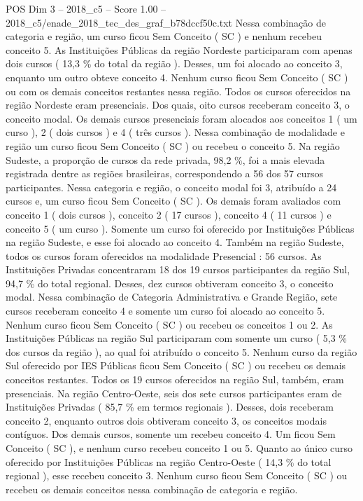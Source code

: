 \begin{textsample}{POS Dim 3 – 2018\_c5 – Score 1.00 – 2018\_c5/enade\_2018\_tec\_des\_graf\_b78dccf50c.txt}
Nessa combinação de categoria e região, um curso ficou Sem Conceito ( SC ) e nenhum recebeu conceito 5.
As Instituições Públicas da região Nordeste participaram com apenas dois cursos ( 13,3 \% do total da região ).
Desses, um foi alocado ao conceito 3, enquanto um outro obteve conceito 4.
Nenhum curso ficou Sem Conceito ( SC ) ou com os demais conceitos restantes nessa região.
Todos os cursos oferecidos na região Nordeste eram presenciais.
Dos quais, oito cursos receberam conceito 3, o conceito modal.
Os demais cursos presenciais foram alocados aos conceitos 1 ( um curso ), 2 ( dois cursos ) e 4 ( três cursos ).
Nessa combinação de modalidade e região um curso ficou Sem Conceito ( SC ) ou recebeu o conceito 5.
Na região Sudeste, a proporção de cursos da rede privada, 98,2 \%, foi a mais elevada registrada dentre as regiões brasileiras, correspondendo a 56 dos 57 cursos participantes.
Nessa categoria e região, o conceito modal foi 3, atribuído a 24 cursos e, um curso ficou Sem Conceito ( SC ).
Os demais foram avaliados com conceito 1 ( dois cursos ), conceito 2 ( 17 cursos ), conceito 4 ( 11 cursos ) e conceito 5 ( um curso ).
Somente um curso foi oferecido por Instituições Públicas na região Sudeste, e esse foi alocado ao conceito 4.
Também na região Sudeste, todos os cursos foram oferecidos na modalidade Presencial : 56 cursos.
As Instituições Privadas concentraram 18 dos 19 cursos participantes da região Sul, 94,7 \% do total regional.
Desses, dez cursos obtiveram conceito 3, o conceito modal.
Nessa combinação de Categoria Administrativa e Grande Região, sete cursos receberam conceito 4 e somente um curso foi alocado ao conceito 5.
Nenhum curso ficou Sem Conceito ( SC ) ou recebeu os conceitos 1 ou 2.
As Instituições Públicas na região Sul participaram com somente um curso ( 5,3 \% dos cursos da região ), ao qual foi atribuído o conceito 5.
Nenhum curso da região Sul oferecido por IES Públicas ficou Sem Conceito ( SC ) ou recebeu os demais conceitos restantes.
Todos os 19 cursos oferecidos na região Sul, também, eram presenciais.
Na região Centro-Oeste, seis dos sete cursos participantes eram de Instituições Privadas ( 85,7 \% em termos regionais ).
Desses, dois receberam conceito 2, enquanto outros dois obtiveram conceito 3, os conceitos modais contíguos.
Dos demais cursos, somente um recebeu conceito 4.
Um ficou Sem Conceito ( SC ), e nenhum curso recebeu conceito 1 ou 5.
Quanto ao único curso oferecido por Instituições Públicas na região Centro-Oeste ( 14,3 \% do total regional ), esse recebeu conceito 3.
Nenhum curso ficou Sem Conceito ( SC ) ou recebeu os demais conceitos nessa combinação de categoria e região.

\end{textsample}
